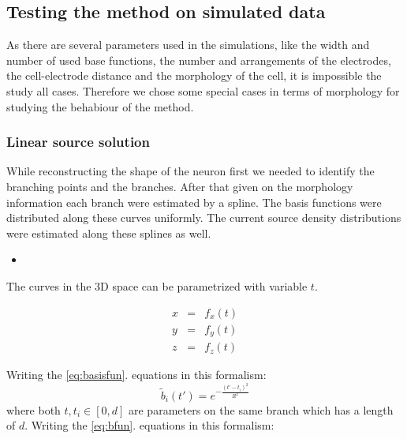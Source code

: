 \documentclass[12pt,a4paper]{article}
\begin{document}
\subsection{Testing the method on simulated data}
As there are several parameters used in the simulations, like the width and number of used base functions, the number and arrangements of the electrodes, the cell-electrode distance and the morphology of the cell, it is impossible the study all cases. Therefore we chose some special cases in terms of morphology for studying the behabiour of the method. 

\subsubsection{ Linear source solution }
While reconstructing the shape of the neuron first we needed to identify the branching points and the branches. After that given on the morphology information each branch were estimated by a spline. The basis functions were distributed along these curves uniformly. The current source density distributions were estimated along these splines as well. 



\begin{itemize}
\item 
\end{itemize}
The curves in the 3D space can be parametrized with variable $t$. 


\begin{eqnarray}
\displaystyle x &=& f_x(t)  \nonumber \\
\displaystyle y &=& f_y(t)  \\
\displaystyle z &=& f_z(t)  \nonumber 
\end{eqnarray}


Writing the \ref{eq:basisfun}. equations in this formalism:
\begin{equation}
\tilde{b}_i (t') = e^{- \frac{(t' - t_i)^2}{R^2}}
\end{equation}
where both $t,t_i \in \left[ 0, d \right] $ are parameters on the same branch which has a length of $d$. 
Writing the \ref{eq:bfun}. equations in this formalism:
\end{document}
